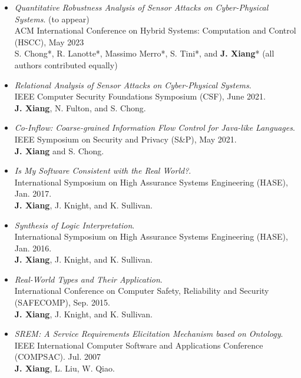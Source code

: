 \documentclass[11pt]{article}
\begin{document}
\begin{itemize}
\item \textit{Quantitative Robustness Analysis of Sensor Attacks on Cyber-Physical Systems}. (to appear) \\
  ACM International Conference on Hybrid Systems: Computation and Control (HSCC), May 2023 \\
  S. Chong*, R. Lanotte*, Massimo Merro*, S. Tini*, and \textbf{J. Xiang}*
  (all authors contributed equally)
\item \textit{Relational Analysis of Sensor Attacks on Cyber-Physical Systems}. \\
  IEEE Computer Security Foundations Symposium (CSF),  June 2021. \\
  \textbf{J. Xiang}, N. Fulton, and S. Chong. 
  
\item \textit{Co-Inflow: Coarse-grained Information Flow Control for Java-like Languages}. \\
  IEEE Symposium on Security and Privacy (S\&P), May 2021.  \\
  \textbf{J. Xiang} and S. Chong.
  
\item \textit{Is My Software Consistent with the Real World?}. \\
  International Symposium on High Assurance Systems Engineering (HASE), Jan. 2017. \\
  \textbf{J. Xiang}, J. Knight, and K. Sullivan.

\item \textit{Synthesis of Logic Interpretation}. \\
  International Symposium on High Assurance Systems Engineering (HASE), Jan. 2016. \\
  \textbf{J. Xiang}, J. Knight, and K. Sullivan.
  
\item \textit{Real-World Types and Their Application}. \\
  International Conference on Computer Safety, Reliability and Security (SAFECOMP), Sep. 2015. \\
  \textbf{J. Xiang}, J. Knight, and K. Sullivan.
  
\item \textit{SREM: A Service Requirements Elicitation Mechanism based on Ontology}.  \\
  IEEE International Computer Software and Applications Conference (COMPSAC). Jul. 2007 \\
  \textbf{J. Xiang}, L. Liu, W. Qiao.  
\end{itemize}
    
\end{document}
